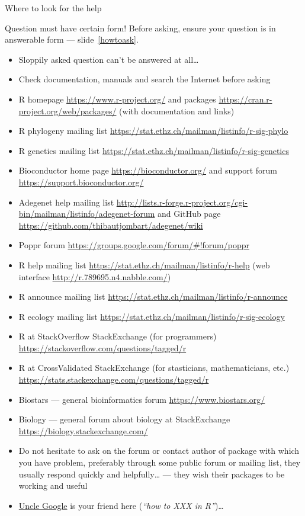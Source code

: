 \documentclass[compress, ucs, xelatex, 11pt, xcolor=svgnames,
  hyperref={
    bookmarks=true,
    unicode=true,
    colorlinks=true,
    pdftitle={Molecular data in R},
    plainpages=false,
    pdfauthor={Vojtech Zeisek},
    pdfsubject={Course about phylogeny and evolution in R},
    pdfcreator={XeLaTeX},
    pdfkeywords={R, evolution, phylogeny, molecular data},
    linkcolor=Tomato,
    anchorcolor=SaddleBrown,
    citecolor=Goldenrod,
    filecolor=DarkMagenta,
    menucolor=Sienna,
    urlcolor=DarkTurquoise,
    pdftex},
  url={hyphens, lowtilde} %
  ]{beamer}
\begin{document}
\begin{frame}[allowframebreaks]{Where to look for the help}
  \label{help}
  \begin{block}{Question must have certain form!}
     Before asking, \alert{ensure your question is in answerable form} --- slide~\ref{howtoask}.
    \begin{itemize}
      \item Sloppily asked question can't be answered at all\ldots
      \item Check documentation, manuals and search the Internet before asking
    \end{itemize}
  \end{block}
  \begin{itemize}
    \item R homepage \url{https://www.r-project.org/} and packages \url{https://cran.r-project.org/web/packages/} (with documentation and links)
    \item R phylogeny mailing list \url{https://stat.ethz.ch/mailman/listinfo/r-sig-phylo}
    \item R genetics mailing list \url{https://stat.ethz.ch/mailman/listinfo/r-sig-genetics}
    \item Bioconductor home page \url{https://bioconductor.org/} and support forum \url{https://support.bioconductor.org/}
    \item Adegenet help mailing list \url{http://lists.r-forge.r-project.org/cgi-bin/mailman/listinfo/adegenet-forum} and GitHub page \url{https://github.com/thibautjombart/adegenet/wiki}
    \item Poppr forum \url{https://groups.google.com/forum/\#!forum/poppr}
    \item R help mailing list \url{https://stat.ethz.ch/mailman/listinfo/r-help} (web interface \url{http://r.789695.n4.nabble.com/})
    \item R announce mailing list \url{https://stat.ethz.ch/mailman/listinfo/r-announce}
    \item R ecology mailing list \url{https://stat.ethz.ch/mailman/listinfo/r-sig-ecology}
    \item R at StackOverflow StackExchange (for programmers) \url{https://stackoverflow.com/questions/tagged/r}
    \item R at CrossValidated StackExchange (for stasticians, mathematicians, etc.) \url{https://stats.stackexchange.com/questions/tagged/r}
    \item Biostars --- general bioinformatics forum \url{https://www.biostars.org/}
    \item Biology --- general forum about biology at StackExchange \url{https://biology.stackexchange.com/}
    \item Do not hesitate to ask on the forum or contact author of package with which you have problem, preferably through some public forum or mailing list, they usually respond quickly and helpfully\ldots{ }--- they wish their packages to be working and useful
    \item \href{http://rseek.org/}{Uncle Google} is your friend here (\textit{``how to XXX in R''})\ldots
  \end{itemize}
\end{frame}
\end{document}
